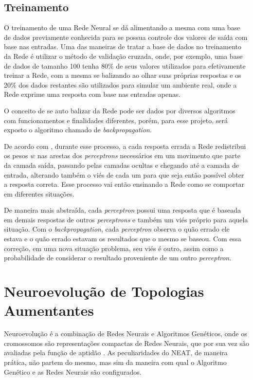 \subsection{Treinamento}

O treinamento de uma Rede Neural se dá alimentando a mesma com uma 
base de dados previamente conhecida para se possua controle dos valores de 
saída com base nas entradas. Uma das maneiras de tratar a base de dados no 
treinamento da Rede é utilizar o método de validação cruzada, onde, por exemplo,
uma base de dados de tamanho 100 tenha 80\% de seus valores utilizados para 
efetivamente treinar a Rede, com a mesma se balizando ao olhar suas próprias 
respostas e os 20\% dos dados restantes são utilizados para simular um ambiente 
real, onde a Rede exprime uma resposta com base nas entradas apenas. 

O conceito de se auto balizar da Rede pode ser dados por diversos 
algoritmos com funcionamentos e finalidades diferentes, porém, para esse projeto, 
será exposto o algoritmo chamado de \textit{backpropagation}. 

De acordo com , durante esse processo, a cada resposta errada 
a Rede redistribui os pesos \(w\) nas arestas dos \textit{perceptrons} necessários em um 
movimento que parte da camada saída, passando pelas camadas ocultas e 
chegando até a camada de entrada, alterando também o viés de cada um para que 
seja então possível obter a resposta correta. Esse processo vai então ensinando a 
Rede como se comportar em diferentes situações.

De maneira mais abstraída, cada \textit{perceptron} possui uma resposta que é 
baseada em demais respostas de outros \textit{perceptrons} e também um viés próprio 
para aquela situação. Com o \textit{backpropagation}, cada \textit{perceptron} observa o quão 
errado ele estava e o quão errado estavam os resultados que o mesmo se baseou. 
Com essa correção, em uma nova situação problema,  seu viés é outro, assim como 
a probabilidade de considerar o resultado proveniente de um outro \textit{perceptron}.

\section{Neuroevolu{\c c}{\~a}o de Topologias Aumentantes}

Neuroevolução é a combinação de Redes Neurais e Algoritmos Genéticos, 
onde os cromossomos são representações compactas de Redes Neurais, que por 
sua vez são avaliadas pela função de aptidão \cite{stanley2004neat}. As peculiaridades 
do NEAT, de maneira prática, não partem do mesmo, mas sim da maneira com qual 
o Algoritmo Genético e as Redes Neurais são configurados. 	

